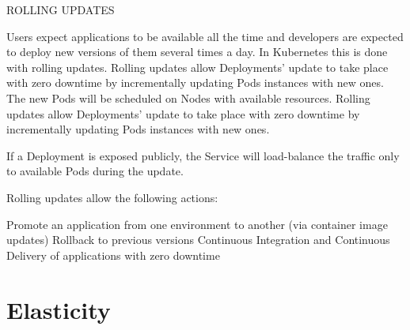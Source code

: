 ROLLING UPDATES

Users expect applications to be available all the time and developers are expected to deploy new versions of them several times a day. In Kubernetes this is done with rolling updates. Rolling updates allow Deployments' update to take place with zero downtime by incrementally updating Pods instances with new ones. The new Pods will be scheduled on Nodes with available resources.
Rolling updates allow Deployments' update to take place with zero downtime by incrementally updating Pods instances with new ones.

If a Deployment is exposed publicly, the Service will load-balance the traffic only to available Pods during the update.

Rolling updates allow the following actions:

Promote an application from one environment to another (via container image updates)
Rollback to previous versions
Continuous Integration and Continuous Delivery of applications with zero downtime


\section{Elasticity}
\label{sec:kubernetes-elasticity}

\lipsum[1]
